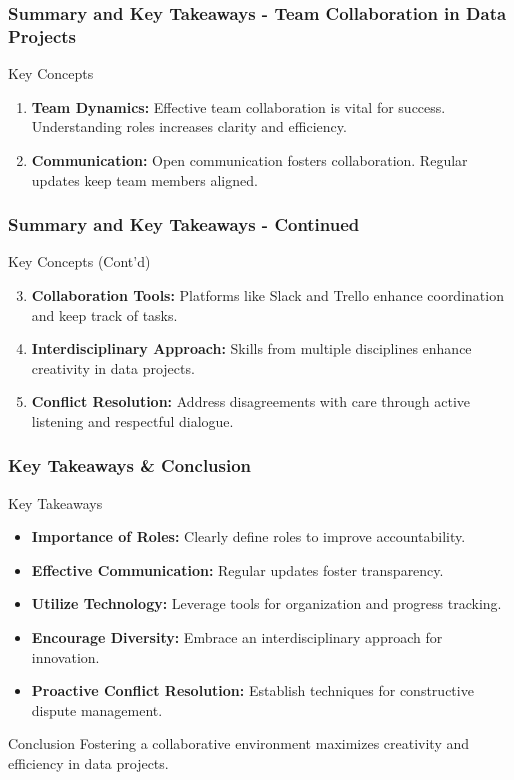 \documentclass[aspectratio=169]{beamer}
\begin{document}
\begin{frame}[fragile]
    \frametitle{Summary and Key Takeaways - Team Collaboration in Data Projects}
    \begin{block}{Key Concepts}
        \begin{enumerate}
            \item \textbf{Team Dynamics:}
            Effective team collaboration is vital for success. Understanding roles increases clarity and efficiency.
            \item \textbf{Communication:}
            Open communication fosters collaboration. Regular updates keep team members aligned.
        \end{enumerate}
    \end{block}
\end{frame}

\begin{frame}[fragile]
    \frametitle{Summary and Key Takeaways - Continued}
    \begin{block}{Key Concepts (Cont'd)}
        \begin{enumerate}
            \setcounter{enumi}{2}
            \item \textbf{Collaboration Tools:}
            Platforms like Slack and Trello enhance coordination and keep track of tasks.
            \item \textbf{Interdisciplinary Approach:}
            Skills from multiple disciplines enhance creativity in data projects.
            \item \textbf{Conflict Resolution:}
            Address disagreements with care through active listening and respectful dialogue.
        \end{enumerate}
    \end{block}
\end{frame}

\begin{frame}[fragile]
    \frametitle{Key Takeaways & Conclusion}
    \begin{block}{Key Takeaways}
        \begin{itemize}
            \item \textbf{Importance of Roles:} Clearly define roles to improve accountability.
            \item \textbf{Effective Communication:} Regular updates foster transparency.
            \item \textbf{Utilize Technology:} Leverage tools for organization and progress tracking.
            \item \textbf{Encourage Diversity:} Embrace an interdisciplinary approach for innovation.
            \item \textbf{Proactive Conflict Resolution:} Establish techniques for constructive dispute management.
        \end{itemize}
    \end{block}
    \begin{block}{Conclusion}
        Fostering a collaborative environment maximizes creativity and efficiency in data projects.
    \end{block}
\end{frame}
\end{document}
